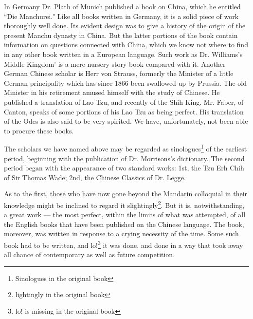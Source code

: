 In Germany Dr. Plath of Munich published a book on China, which he entitled ``Die Manchurei."
Like all books written in Germany, it is a solid piece of work thoroughly well done.
Its evident design was to give a history of the origin of the present Manchu dynasty in China.
But the latter portions of the book contain information on questions connected with China, which we know not where to find in any other book written in a European language.
Such work as Dr. Williams's Middle Kingdom' is a mere nursery story-book compared with it.
Another German Chinese scholar is Herr von Strauss, formerly the Minister of a little German principality which has since 1866 been swallowed up by Prussia.
The old Minister in his retirement amused himself with the study of Chinese.
He published a translation of Lao Tzu, and recently of the Shih King.
Mr. Faber, of Canton, speaks of some portions of his Lao Tzu as being perfect.
His translation of the Odes is also said to be very spirited.
We have, unfortunately, not been able to procure these books.

The scholars we have named above may be regarded as sinologues\footnote{Sinologues in the original book} of the earliest period, beginning with the publication of Dr. Morrisons's dictionary.
The second period began with the appearance of two standard works: 1st, the Tzu Erh Chih of Sir Thomas Wade; 2nd, the Chinese Classics of Dr. Legge.

As to the first, those who have now gone beyond the Mandarin colloquial in their knowledge might be inclined to regard it slightingly\footnote{lightingly in the original book}.
But it is, notwithstanding, a great work --- the most perfect, within the limits of what was attempted, of all the English books that have been published on the Chinese language.
The book, moreover, was written in response to a crying necessity of the time.
Some such book had to be written, and lo!\footnote{lo! is missing in the original book} it was done, and done in a way that took away all chance of contemporary as well as future competition.

